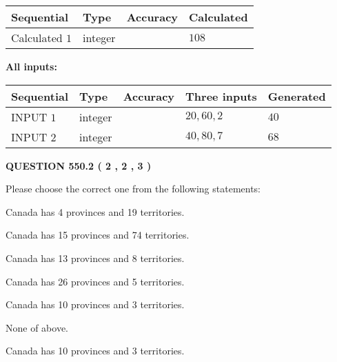 \documentclass[12pt]{article}
\begin{document}
   
  
  
\noindent\begin{tabular}{|l|l|l|l|}
\hline
 Sequential & Type & Accuracy & Calculated \\ 
\hline
 
 
  Calculated $  1 $ & integer &  & 
  $ 108 $ 
 \\  \hline  
 \end{tabular}
   
   
   
   
\noindent\vspace{0.1in}\hspace{-0.08in} {\textbf{\Large{All inputs: }}}
   
   
  
  
\noindent\begin{tabular}{|l|l|l|l|l|}
\hline
 Sequential & Type & Accuracy & Three inputs & Generated \\ 
\hline
 
 
  INPUT $  1 $ & integer &  & $
 20
 , 
 60
 , 
 2
 $ & $ 40 $ 
 \\  \hline  
 
 
  INPUT $  2 $ & integer &  & $
 40
 , 
 80
 , 
 7
 $ & $ 68 $ 
 \\  \hline  
 \end{tabular}
   
   
  
\vspace{0.2in}
  
{\textbf{\Large{QUESTION
550.2 
 ( 2 , 2 , 3 )
}}}
  
  
Please choose the correct one from the following statements:
 
 
Canada has   4 provinces and  19 territories.
 
 
Canada has  15 provinces and  74 territories.
 
 
Canada has  13 provinces and  8 territories.
 
 
Canada has  26 provinces and  5 territories.
 
 
Canada has 10  provinces and 3 territories.
 
 
 None of above.
 
 
\noindent{}
 
 
Canada has 10  provinces and 3 territories.
 
\end{document}

